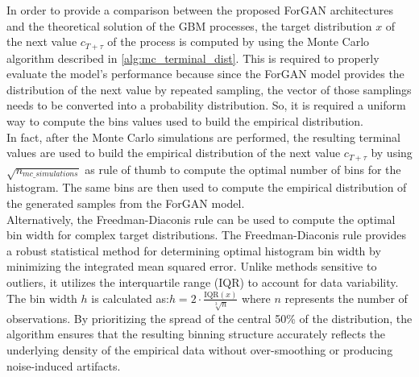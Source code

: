 In order to provide a comparison between the proposed ForGAN architectures and 
the theoretical solution of the GBM processes, the target distribution $x$ of the next value $c_{T + \tau}$ of the process is computed by using the Monte Carlo algorithm described in \ref{alg:mc_terminal_dist}.
This is required to properly evaluate the model's performance because since the ForGAN model provides the distribution of the next value by repeated sampling, the vector of those samplings needs to be converted into a probability distribution. 
So, it is required a uniform way to compute the bins values used to build the empirical distribution.\\
In fact, after the Monte Carlo simulations are performed, the resulting terminal values are used to build the empirical distribution of the next value $c_{T + \tau}$ by using $\sqrt{n_{mc\_simulations}}$ as rule of thumb to compute the optimal number of bins for the histogram. 
The same bins are then used to compute the empirical distribution of the generated samples from the ForGAN model.\\
Alternatively, the Freedman-Diaconis rule can be used \cite{forgan:freedman_bins} to compute the optimal bin width for complex target distributions.
The Freedman-Diaconis rule provides a robust statistical method for determining optimal histogram bin width by minimizing the integrated mean squared error. 
Unlike methods sensitive to outliers, it utilizes the interquartile range (IQR) to account for data variability. 
The bin width $h$ is calculated as:$h = 2 \cdot \frac{\text{IQR}(x)}{\sqrt[3]{n}}$ where $n$ represents the number of observations.
By prioritizing the spread of the central 50\% of the distribution, 
the algorithm ensures that the resulting binning structure accurately reflects the underlying density of the empirical data without over-smoothing or producing noise-induced artifacts.\\

